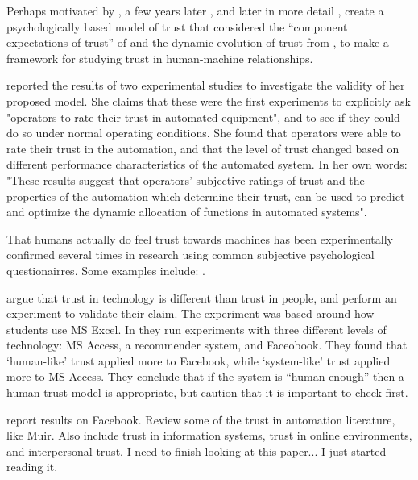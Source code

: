         Perhaps motivated by \citeauthor{Sheridan1984-kx}\cite{Sheridan1984-kx}, a few years later \cite{Muir1987-mk}, and later in more detail \cite{Muir1994-ow}, create a psychologically based model of trust that considered the ``component expectations of trust'' of \cite{Barber1983-yc} and the dynamic evolution of trust from \cite{Rempel1985-sg}, to make a framework for studying trust in human-machine relationships.
    
        \citet{Muir1996-gt} reported the results of two experimental studies to investigate the validity of her proposed model. She claims that these were the first experiments to explicitly ask "operators to rate their trust in automated equipment", and to see if they could do so under normal operating conditions. She found that operators were able to rate their trust in the automation, and that the level of trust changed based on different performance characteristics of the automated system. In her own words: "These results suggest that operators' subjective ratings of trust and the properties of the automation which determine their trust, can be used to predict and optimize the dynamic allocation of functions in automated systems".

        That humans actually do feel trust towards machines has been experimentally confirmed several times in research using common subjective psychological questionairres. Some examples include: \citet{Muir1996-gt,Reeves1997-ad,Groom2007-bz,Mcknight2011-gv,Riley1996-qm,Bainbridge2011-pl,Kaniarasu2012-mo,Salem2015-md,Desai2012-rc, Freedy2007-sg, Wang2016-id, Inagaki1998-cl, Kaniarasu2013-ho}.

        \citet{Mcknight2011-gv} argue that trust in technology is different than trust in people, and perform an experiment to validate their claim. The experiment was based around how students use MS Excel. In \cite{Tripp2011-cq} they run experiments with three different levels of technology: MS Access, a recommender system, and Faceobook. They found that `human-like' trust applied more to Facebook, while `system-like' trust applied more to MS Access. They conclude that if the system is ``human enough'' then a human trust model is appropriate, but caution that it is important to check first.

        \cite{Lankton2008-ct} report results on Facebook. Review some of the trust in automation literature, like Muir. Also include trust in information systems, trust in online environments, and interpersonal trust. I need to finish looking at this paper... I just started reading it.

